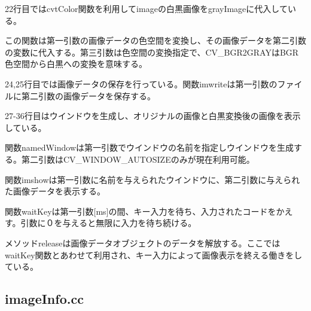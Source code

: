 \documentclass{jsarticle}
\begin{document}
22行目ではcvtColor関数を利用してimageの白黒画像をgrayImageに代入している。  

この関数は第一引数の画像データの色空間を変換し、その画像データを第二引数の変数に代入する。第三引数は色空間の変換指定で、CV\_BGR2GRAYはBGR色空間から白黒への変換を意味する。  

24,25行目では画像データの保存を行っている。関数imwriteは第一引数のファイルに第二引数の画像データを保存する。  

27-36行目はウインドウを生成し、オリジナルの画像と白黒変換後の画像を表示している。  

関数namedWindowは第一引数でウインドウの名前を指定しウインドウを生成する。第二引数はCV\_WINDOW\_AUTOSIZEのみが現在利用可能。  

関数imshowは第一引数に名前を与えられたウインドウに、第二引数に与えられた画像データを表示する。  

関数waitKeyは第一引数[ms]の間、キー入力を待ち、入力されたコードをかえす。引数に０を与えると無限に入力を待ち続ける。  

メソッドreleaseは画像データオブジェクトのデータを解放する。ここではwaitKey関数とあわせて利用され、キー入力によって画像表示を終える働きをしている。

\subsection{imageInfo.cc}
\end{document}
